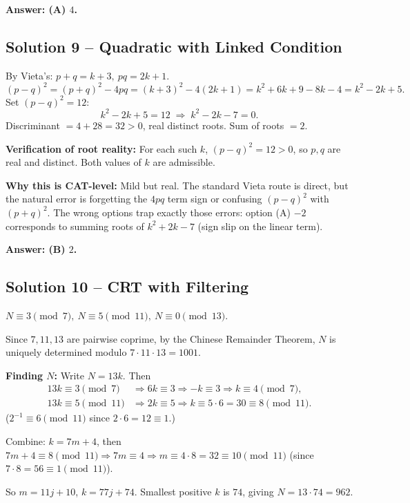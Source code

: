 \documentclass[11pt,a4paper]{article}
\begin{document}
\textbf{Answer: (A) $4$.}

\medskip

\subsection*{Solution 9 -- Quadratic with Linked Condition}
By Vieta's: $p+q=k+3,\ pq=2k+1.$ 
\[
(p-q)^{2}=(p+q)^{2}-4pq=(k+3)^{2}-4(2k+1)=k^{2}+6k+9-8k-4=k^{2}-2k+5.
\]
Set $(p-q)^{2}=12$:
\[
k^{2}-2k+5=12 \;\Longrightarrow\; k^{2}-2k-7=0.
\]
Discriminant $=4+28=32>0$, real distinct roots. Sum of roots $=2.$

\textbf{Verification of root reality:} For each such $k$, $(p-q)^2 = 12 > 0$, so $p, q$ are real and distinct. Both values of $k$ are admissible.

\textbf{Why this is CAT-level:} Mild but real. The standard Vieta route is direct, but the natural error is forgetting the $4pq$ term sign or confusing $(p-q)^2$ with $(p+q)^2$. The wrong options trap exactly those errors: option (A) $-2$ corresponds to summing roots of $k^2+2k-7$ (sign slip on the linear term).

\textbf{Answer: (B) $2$.}

\medskip

\subsection*{Solution 10 -- CRT with Filtering}
$N\equiv 3\pmod 7,\ N\equiv 5\pmod{11},\ N\equiv 0\pmod{13}.$

Since $7,11,13$ are pairwise coprime, by the Chinese Remainder Theorem, $N$ is uniquely determined modulo $7\cdot 11\cdot 13 = 1001.$

\textbf{Finding $N$:} Write $N=13k$. Then
\begin{align*}
13k \equiv 3\pmod 7 &\Rightarrow 6k \equiv 3 \Rightarrow -k \equiv 3 \Rightarrow k \equiv 4\pmod 7,\\
13k \equiv 5\pmod{11} &\Rightarrow 2k \equiv 5 \Rightarrow k \equiv 5\cdot 6 = 30 \equiv 8 \pmod{11}.
\end{align*}
($2^{-1}\equiv 6 \pmod{11}$ since $2\cdot 6 = 12\equiv 1$.)

Combine: $k=7m+4$, then $7m+4\equiv 8\pmod{11} \Rightarrow 7m\equiv 4 \Rightarrow m\equiv 4\cdot 8=32\equiv 10\pmod{11}$ (since $7\cdot 8 = 56\equiv 1\pmod{11}$).

So $m = 11j+10$, $k = 77j+74$. Smallest positive $k$ is $74$, giving $N = 13\cdot 74 = 962.$
\end{document}
